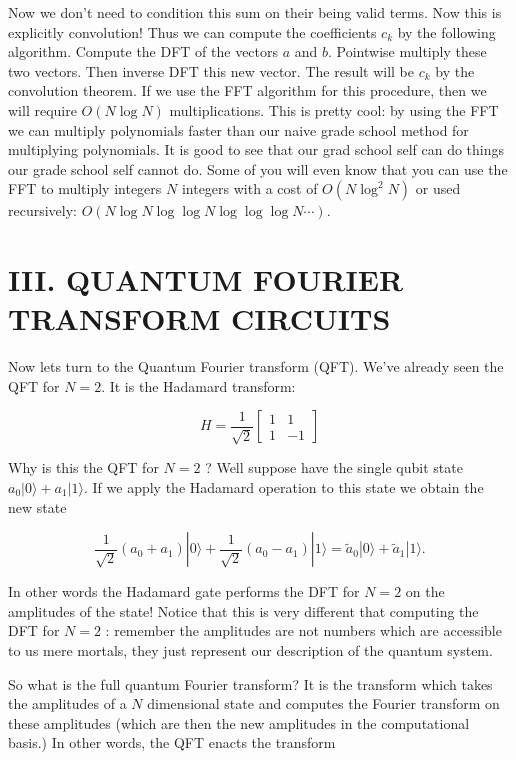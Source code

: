 \documentclass[10pt]{article}
\begin{document}
Now we don't need to condition this sum on their being valid terms. Now this is explicitly convolution! Thus we can compute the coefficients $c_{k}$ by the following algorithm. Compute the DFT of the vectors $a$ and $b$. Pointwise multiply these two vectors. Then inverse DFT this new vector. The result will be $c_{k}$ by the convolution theorem. If we use the FFT algorithm for this procedure, then we will require $O(N \log N)$ multiplications. This is pretty cool: by using the FFT we can multiply polynomials faster than our naive grade school method for multiplying polynomials. It is good to see that our grad school self can do things our grade school self cannot do. Some of you will even know that you can use the FFT to multiply integers $N$ integers with a cost of $O\left(N \log ^{2} N\right)$ or used recursively: $O(N \log N \log \log N \log \log \log N \cdots)$.

\section*{III. QUANTUM FOURIER TRANSFORM CIRCUITS}
Now lets turn to the Quantum Fourier transform (QFT). We've already seen the QFT for $N=2$. It is the Hadamard transform:

\[
H=\frac{1}{\sqrt{2}}\left[\begin{array}{cc}
1 & 1  \tag{16}\\
1 & -1
\end{array}\right]
\]

Why is this the QFT for $N=2$ ? Well suppose have the single qubit state $a_{0}|0\rangle+a_{1}|1\rangle$. If we apply the Hadamard operation to this state we obtain the new state


\begin{equation*}
\frac{1}{\sqrt{2}}\left(a_{0}+a_{1}\right)|0\rangle+\frac{1}{\sqrt{2}}\left(a_{0}-a_{1}\right)|1\rangle=\tilde{a}_{0}|0\rangle+\tilde{a}_{1}|1\rangle . \tag{17}
\end{equation*}


In other words the Hadamard gate performs the DFT for $N=2$ on the amplitudes of the state! Notice that this is very different that computing the DFT for $N=2$ : remember the amplitudes are not numbers which are accessible to us mere mortals, they just represent our description of the quantum system.

So what is the full quantum Fourier transform? It is the transform which takes the amplitudes of a $N$ dimensional state and computes the Fourier transform on these amplitudes (which are then the new amplitudes in the computational basis.) In other words, the QFT enacts the transform
\end{document}
